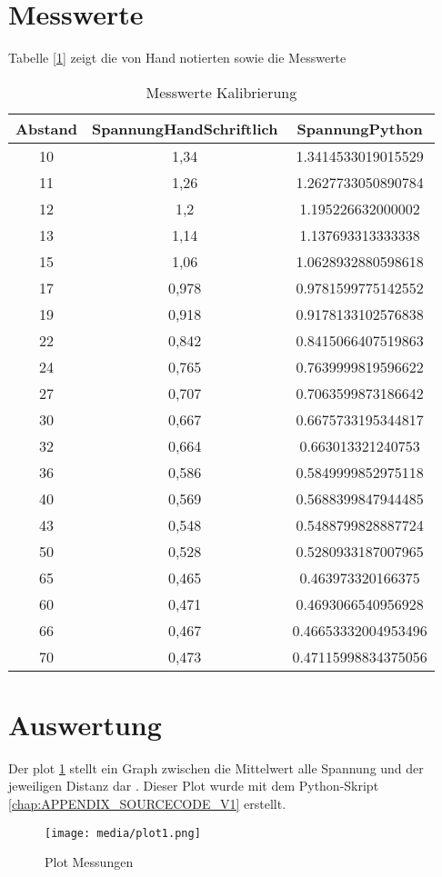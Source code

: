 \documentclass[12pt, oneside, a4paper, \docLanguage]{report}
\begin{document}
\section{Messwerte}
\label{chap:VERSUCH_1_MESSWERTE}
Tabelle [\ref{chap:VERSUCH_1_MESSWERTE}] zeigt die von Hand notierten sowie die Messwerte
\begin{table}[H]
	\centering\small
	\begin{tabular}{|c|c|c}
	\hline
	Abstand & SpannungHandSchriftlich & SpannungPython \\
	\hline
	10 & 1,34 & 1.3414533019015529 \\
	\hline
	11 & 1,26 & 1.2627733050890784 \\
	\hline
	12 & 1,2 & 1.195226632000002 \\
	\hline
	13 & 1,14 & 1.137693313333338 \\ 
	\hline
	15 & 1,06 & 1.0628932880598618 \\
	\hline
	17 & 0,978 & 0.9781599775142552 \\
	\hline
	19 & 0,918 & 0.9178133102576838 \\
	\hline
	22 & 0,842 & 0.8415066407519863 \\
	\hline
	24 & 0,765 & 0.7639999819596622 \\
	\hline
	27 & 0,707 & 0.7063599873186642 \\
	\hline
	30 & 0,667 & 0.6675733195344817 \\
	\hline
	32 & 0,664 & 0.663013321240753 \\
	\hline
	36 & 0,586 & 0.5849999852975118 \\
	\hline
	40 & 0,569 & 0.5688399847944485 \\
	\hline
	43 & 0,548 & 0.5488799828887724 \\
	\hline
	50 & 0,528 & 0.5280933187007965 \\
	\hline
	65 & 0,465 & 0.463973320166375 \\
	\hline
	60 & 0,471 & 0.4693066540956928 \\
	\hline
	66 & 0,467 & 0.46653332004953496 \\
	\hline
	70 & 0,473 & 0.47115998834375056 \\
	\hline
	\end{tabular}
	\caption{Messwerte Kalibrierung}
	\label{fig:VERSUCH_1_MESSWERTE_TABELLE}
\end{table}


\section{Auswertung}
\label{chap:VERSUCH_1_AUSWERTUNG}
Der plot \ref{fig:VERSUCH_1_AUSWERTUNG_PLOT} stellt ein Graph zwischen die Mittelwert alle Spannung und der jeweiligen Distanz dar . Dieser Plot wurde mit dem Python-Skript \ref{chap:APPENDIX_SOURCECODE_V1} erstellt.
\begin{figure}[H]
	\centering\small
	\texttt{[image: media/plot1.png]}
	\caption{Plot Messungen}
	\label{fig:VERSUCH_1_AUSWERTUNG_PLOT}
\end{figure}
\end{document}
